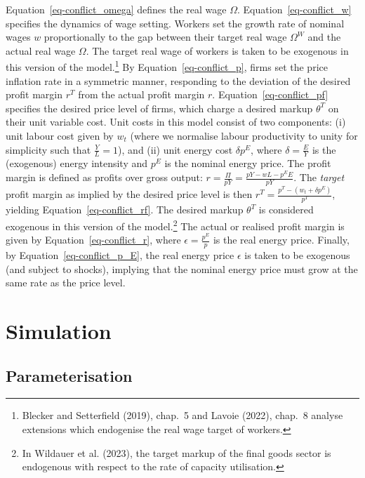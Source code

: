 \documentclass[
  letterpaper,
  DIV=11,
  numbers=noendperiod]{scrreprt}
\begin{document}
Equation~\ref{eq-conflict_omega} defines the real wage \(\Omega\).
Equation~\ref{eq-conflict_w} specifies the dynamics of wage setting.
Workers set the growth rate of nominal wages \(w\) proportionally to the
gap between their target real wage \(\Omega^W\) and the actual real wage
\(\Omega\). The target real wage of workers is taken to be exogenous in
this version of the model.\footnote{Blecker and Setterfield (2019),
  chap.~5 and Lavoie (2022), chap.~8 analyse extensions which endogenise
  the real wage target of workers.} By Equation~\ref{eq-conflict_p},
firms set the price inflation rate in a symmetric manner, responding to
the deviation of the desired profit margin \(r^T\) from the actual
profit margin \(r\). Equation~\ref{eq-conflict_pf} specifies the desired
price level of firms, which charge a desired markup \(\theta^T\) on
their unit variable cost. Unit costs in this model consist of two
components: (i) unit labour cost given by \(w_t\) (where we normalise
labour productivity to unity for simplicity such that
\(\frac{Y}{L}=1\)), and (ii) unit energy cost \(\delta p^E\), where
\(\delta =\frac{E}{Y}\) is the (exogenous) energy intensity and \(p^E\)
is the nominal energy price. The profit margin is defined as profits
over gross output: \(r=\frac{\Pi}{pY}=\frac{pY-wL-p^E E}{pY}\). The
\emph{target} profit margin as implied by the desired price level is
then \(r^T = \frac{p^T - (w_t + \delta p^E) }{p^T}\), yielding
Equation~\ref{eq-conflict_rf}. The desired markup \(\theta^T\) is
considered exogenous in this version of the model.\footnote{In Wildauer
  et al. (2023), the target markup of the final goods sector is
  endogenous with respect to the rate of capacity utilisation.} The
actual or realised profit margin is given by
Equation~\ref{eq-conflict_r}, where \(\epsilon=\frac{p^E}{p}\) is the
real energy price. Finally, by Equation~\ref{eq-conflict_p_E}, the real
energy price \(\epsilon\) is taken to be exogenous (and subject to
shocks), implying that the nominal energy price must grow at the same
rate as the price level.

\section{Simulation}\label{simulation-7}

\subsection{Parameterisation}\label{parameterisation-7}
\end{document}
